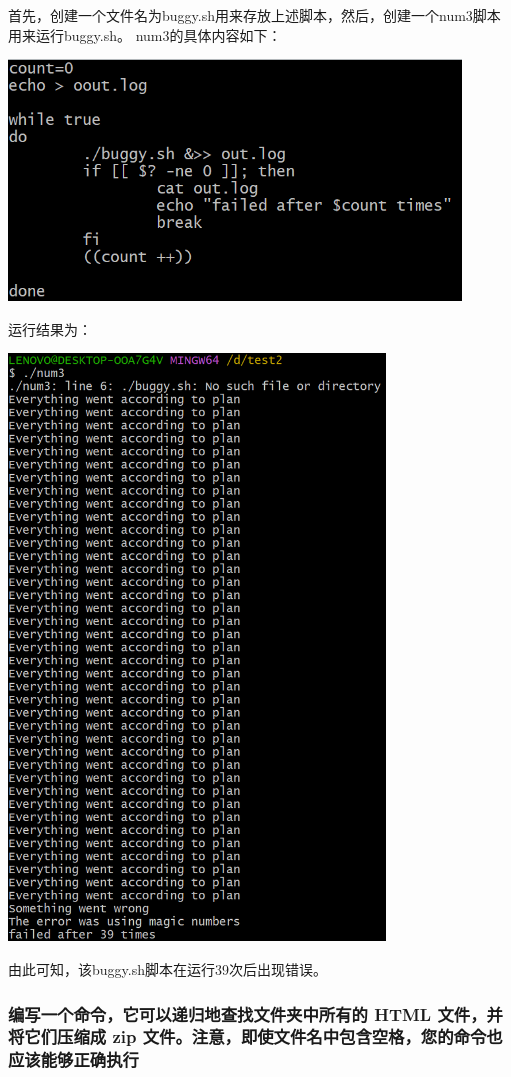 \documentclass[UTF8,a4paper]{ctexart}
\begin{document}
\begin{sloppypar}
	首先，创建一个文件名为buggy.sh用来存放上述脚本，然后，创建一个num3脚本用来运行buggy.sh。 num3的具体内容如下：

	\includegraphics[width = 12cm]{10}

	运行结果为：

	\includegraphics[width = 10cm]{11}

	由此可知，该buggy.sh脚本在运行39次后出现错误。

	\subsubsection{编写一个命令，它可以递归地查找文件夹中所有的 HTML 文件，并将它们压缩成 zip 文件。注意，即使文件名中包含空格，您的命令也应该能够正确执行}
	

\end{sloppypar}
\end{document}
